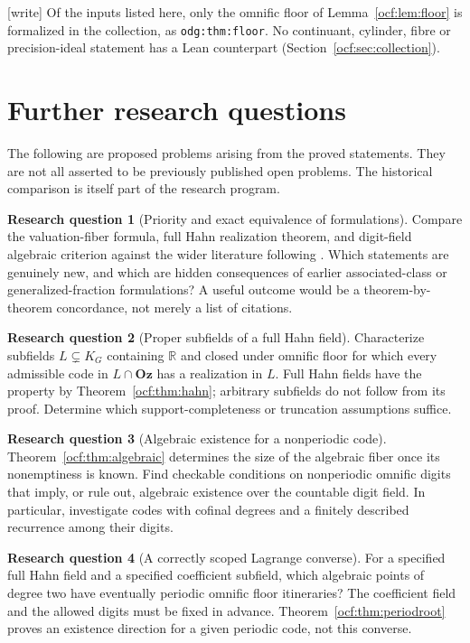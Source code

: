\documentclass[11pt,a4paper]{article}
\numberwithin{equation}{section}
\theoremstyle{definition}
\newtheorem{problem}{Research question}
\theoremstyle{remark}
\newcommand{\Oz}{\mathbf{Oz}}
\newcommand{\R}{\mathbb R}
\newcommand{\lbl}[1]{\nolinkurl{#1}}%
\newcommand{\wtag}{\textup{[write]}}%
\begin{document}
\wtag{} Of the inputs listed here, only the omnific floor of
Lemma~\ref{ocf:lem:floor} is formalized in the collection, as
\lbl{odg:thm:floor}. No continuant, cylinder, fibre or precision-ideal
statement has a Lean counterpart (Section~\ref{ocf:sec:collection}).

\section{Further research questions}
\label{ocf:sec:questions}

The following are proposed problems arising from the proved statements.
They are not all asserted to be previously published open problems. The
historical comparison is itself part of the research program.

\begin{problem}[Priority and exact equivalence of formulations]\label{ocf:q:priority}
Compare the valuation-fiber formula, full Hahn realization theorem, and
digit-field algebraic criterion against the wider literature following
\cite{Roggeman}. Which statements are genuinely new, and which are hidden
consequences of earlier associated-class or generalized-fraction
formulations? A useful outcome would be a theorem-by-theorem concordance,
not merely a list of citations.
\end{problem}

\begin{problem}[Proper subfields of a full Hahn field]\label{ocf:q:subfields}
Characterize subfields $L\subsetneq K_G$ containing $\R$ and closed under
omnific floor for which every admissible code in $L\cap\Oz$ has a
realization in $L$. Full Hahn fields have the property by
Theorem~\ref{ocf:thm:hahn}; arbitrary subfields do not follow from its proof.
Determine which support-completeness or truncation assumptions suffice.
\end{problem}

\begin{problem}[Algebraic existence for a nonperiodic code]\label{ocf:q:nonperiodic}
Theorem~\ref{ocf:thm:algebraic} determines the size of the algebraic fiber
once its nonemptiness is known. Find checkable conditions on nonperiodic
omnific digits that imply, or rule out, algebraic existence over the
countable digit field. In particular, investigate codes with cofinal
degrees and a finitely described recurrence among their digits.
\end{problem}

\begin{problem}[A correctly scoped Lagrange converse]\label{ocf:q:lagrange}
For a specified full Hahn field and a specified coefficient subfield,
which algebraic points of degree two have eventually periodic omnific
floor itineraries? The coefficient field and the allowed digits must be
fixed in advance. Theorem~\ref{ocf:thm:periodroot} proves an existence direction
for a given periodic code, not this converse.
\end{problem}
\end{document}
